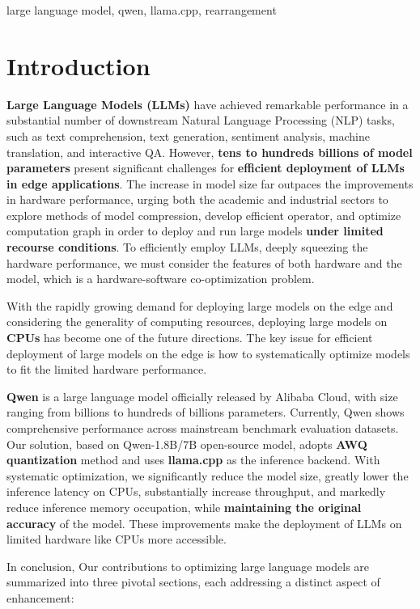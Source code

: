 \documentclass[conference]{IEEEtran}
\begin{document}
\begin{IEEEkeywords}
large language model, qwen, llama.cpp, rearrangement
\end{IEEEkeywords}

\section{Introduction}
\textbf{Large Language Models (LLMs)} have achieved remarkable performance in a substantial number of downstream Natural Language Processing (NLP) tasks, such as text comprehension, text generation, sentiment analysis, machine translation, and interactive QA. However, \textbf{tens to hundreds billions of model parameters} present significant challenges for \textbf{efficient deployment of LLMs in edge applications}. The increase in model size far outpaces the improvements in hardware performance, urging both the academic and industrial sectors to explore methods of model compression, develop efficient operator, and optimize computation graph in order to deploy and run large models \textbf{under limited recourse conditions}. To efficiently employ LLMs, deeply squeezing the hardware performance, we must consider the features of both hardware and the model, which is a hardware-software co-optimization problem. 

With the rapidly growing demand for deploying large models on the edge and considering the generality of computing resources, deploying large models on \textbf{CPUs} has become one of the future directions. The key issue for efficient deployment of large models on the edge is how to systematically optimize models to fit the limited hardware performance.

\textbf{Qwen} is a large language model officially released by Alibaba Cloud, with size ranging from billions to hundreds of billions parameters. Currently, Qwen shows comprehensive performance across mainstream benchmark evaluation datasets. Our solution, based on Qwen-1.8B/7B open-source model, adopts \textbf{AWQ quantization} method and uses \textbf{llama.cpp} as the inference backend. With systematic optimization, we significantly reduce the model size, greatly lower the inference latency on CPUs, substantially increase throughput, and markedly reduce inference memory occupation, while \textbf{maintaining the original accuracy} of the model. These improvements make the deployment of LLMs on limited hardware like CPUs more accessible.

In conclusion, Our contributions to optimizing large language models are summarized into three pivotal sections, each addressing a distinct aspect of enhancement:
\end{document}
